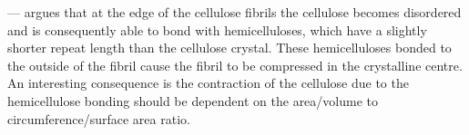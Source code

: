 --- argues that at the edge of the cellulose fibrils the cellulose becomes
disordered and is consequently able to bond with hemicelluloses, which have a
slightly shorter repeat length than the cellulose crystal. These hemicelluloses
bonded to the outside of the fibril cause the fibril to be compressed in the
crystalline centre. An interesting consequence
is the contraction of the cellulose due to the hemicellulose bonding should be
dependent on the area/volume to circumference/surface area ratio.